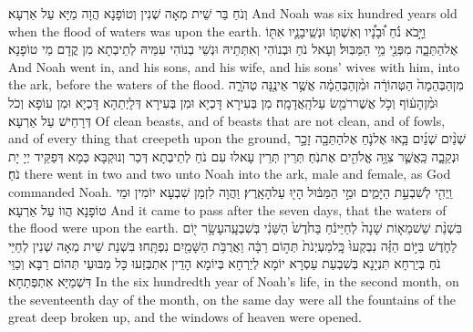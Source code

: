 {וְנֹחַ בַּר שֵׁית מְאָה שְׁנִין וְטוֹפָנָא הֲוָה מַיָּא עַל אַרְעָא׃}
{And Noah was six hundred years old when the flood of waters was upon the earth.}{}
{וַיָּ֣בֹא נֹ֗חַ וּ֠בָנָ֠יו וְאִשְׁתּ֧וֹ וּנְשֵֽׁי\maqqaf בָנָ֛יו אִתּ֖וֹ אֶל\maqqaf הַתֵּבָ֑ה מִפְּנֵ֖י מֵ֥י הַמַּבּֽוּל׃}
{וְעָאל נֹחַ וּבְנוֹהִי וְאִתְּתֵיהּ וּנְשֵׁי בְנוֹהִי עִמֵּיהּ לְתֵיבְתָא מִן קֳדָם מֵי טוֹפָנָא׃}
{And Noah went in, and his sons, and his wife, and his sons’ wives with him, into the ark, before the waters of the flood.}{}
{מִן\maqqaf הַבְּהֵמָה֙ הַטְּהוֹרָ֔ה וּמִ֨ן\maqqaf הַבְּהֵמָ֔ה אֲשֶׁ֥ר אֵינֶ֖נָּה טְהֹרָ֑ה וּמִ֨ן\maqqaf הָע֔וֹף וְכֹ֥ל אֲשֶׁר\maqqaf רֹמֵ֖שׂ עַל\maqqaf הָֽאֲדָמָֽה׃}
{מִן בְּעִירָא דָּכְיָא וּמִן בְּעִירָא דְּלָיְתַהָא דָּכְיָא וּמִן עוֹפָא וְכֹל דְּרָחֵישׁ עַל אַרְעָא׃}
{Of clean beasts, and of beasts that are not clean, and of fowls, and of every thing that creepeth upon the ground,}{}
{שְׁנַ֨יִם שְׁנַ֜יִם בָּ֧אוּ אֶל\maqqaf נֹ֛חַ אֶל\maqqaf הַתֵּבָ֖ה זָכָ֣ר וּנְקֵבָ֑ה כַּֽאֲשֶׁ֛ר צִוָּ֥ה אֱלֹהִ֖ים אֶת\maqqaf נֹֽחַ׃}
{תְּרֵין תְּרֵין עָאלוּ עִם נֹחַ לְתֵיבְתָא דְּכַר וְנוּקְבָּא כְּמָא דְּפַקֵּיד יְיָ יָת נֹחַ׃}
{there went in two and two unto Noah into the ark, male and female, as God commanded Noah.}{}
{וַֽיְהִ֖י לְשִׁבְעַ֣ת הַיָּמִ֑ים וּמֵ֣י הַמַּבּ֔וּל הָי֖וּ עַל\maqqaf הָאָֽרֶץ׃}
{וַהֲוָה לִזְמַן שִׁבְעָא יוֹמִין וּמֵי טוֹפָנָא הֲווֹ עַל אַרְעָא׃}
{And it came to pass after the seven days, that the waters of the flood were upon the earth.}{}
{בִּשְׁנַ֨ת שֵׁשׁ\maqqaf מֵא֤וֹת שָׁנָה֙ לְחַיֵּי\maqqaf נֹ֔חַ בַּחֹ֙דֶשׁ֙ הַשֵּׁנִ֔י בְּשִׁבְעָֽה\maqqaf עָשָׂ֥ר י֖וֹם לַחֹ֑דֶשׁ בַּיּ֣וֹם הַזֶּ֗ה נִבְקְעוּ֙ כׇּֽל\maqqaf מַעְיְנֹת֙ תְּה֣וֹם רַבָּ֔ה וַאֲרֻבֹּ֥ת הַשָּׁמַ֖יִם נִפְתָּֽחוּ׃}
{בִּשְׁנַת שֵׁית מְאָה שְׁנִין לְחַיֵּי נֹחַ בְּיַרְחָא תִּנְיָנָא בְּשִׁבְעַת עַסְרָא יוֹמָא לְיַרְחָא בְּיוֹמָא הָדֵין אִתְבְּזַעוּ כָּל מַבּוּעֵי תְּהוֹם רַבָּא וְכַוֵּי דִּשְׁמַיָּא אִתְפְּתַחָא׃}
{In the six hundredth year of Noah’s life, in the second month, on the seventeenth day of the month, on the same day were all the fountains of the great deep broken up, and the windows of heaven were opened.}{}
